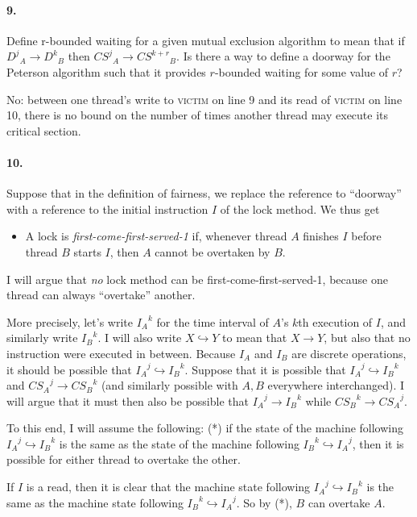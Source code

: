 \paragraph{9.} Define r-bounded waiting for a given mutual exclusion algorithm to
mean that if ${D^j}_A \to {D^k}_B$ then ${CS^j}_A \to {CS^{k+r}}_B$. 
Is there a way to define a doorway for the Peterson algorithm such that it provides $r$-bounded waiting for some value of $r$?

No: between one thread's write to \textsc{victim} on line 9 and its read of \textsc{victim} on line 10, there is no bound on the number of times another thread may execute its critical section.

\paragraph{10.} Suppose that in the definition of fairness, we replace the reference to ``doorway'' with a reference to the initial instruction $I$ of the lock method.  We thus get
\begin{itemize}
\item[] A lock is \emph{first-come-first-served-1} if, whenever thread $A$ finishes $I$ before thread $B$ starts $I$, then $A$ cannot be overtaken by $B$.  
\end{itemize}
I will argue that \emph{no} lock method can be first-come-first-served-1, because one thread can always ``overtake'' another.  

More precisely, let's write ${I_A}^k$ for the time interval of $A$'s $k$th execution of $I$, and similarly write ${I_B}^k$.  I will also write $X\hookrightarrow Y$ to mean that $X\to Y$, but also that no instruction were executed in between. 
Because $I_A$ and $I_B$ are discrete operations, it should be possible that ${I_A}^j\hookrightarrow {I_B}^k$.
Suppose that it is possible that ${I_A}^j\hookrightarrow {I_B}^k$ and ${CS_A}^j\to {CS_B}^k$ (and similarly possible with $A, B$ everywhere interchanged). I will argue that it must then also be possible that ${I_A}^j\to {I_B}^k$ while ${CS_B}^k\to {CS_A}^j$.

To this end, I will assume the following: (*) if the state of the machine following ${I_A}^j\hookrightarrow {I_B}^k$ is the same as the state of the machine following ${I_B}^k\hookrightarrow {I_A}^j$, then it is possible for either thread to overtake the other.  

If $I$ is a read, then it is clear that the machine state following ${I_A}^j\hookrightarrow {I_B}^k$ is the same as the machine state following ${I_B}^k\hookrightarrow {I_A}^j$.  So by (*), $B$ can overtake $A$.

